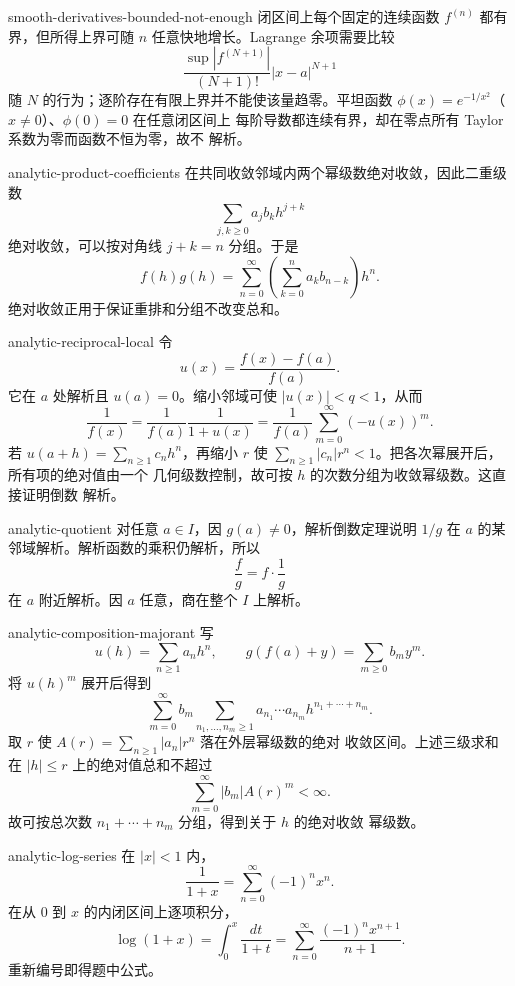 \begin{solution}{smooth-derivatives-bounded-not-enough}
闭区间上每个固定的连续函数 \(f^{(n)}\) 都有界，但所得上界可随 \(n\)
任意快地增长。Lagrange 余项需要比较
\[
 \frac{\sup|f^{(N+1)}|}{(N+1)!}|x-a|^{N+1}
\]
随 \(N\) 的行为；逐阶存在有限上界并不能使该量趋零。平坦函数
\(\phi(x)=e^{-1/x^2}\)（\(x\ne0\)）、\(\phi(0)=0\) 在任意闭区间上
每阶导数都连续有界，却在零点所有 Taylor 系数为零而函数不恒为零，故不
解析。
\end{solution}

\begin{solution}{analytic-product-coefficients}
在共同收敛邻域内两个幂级数绝对收敛，因此二重级数
\[
 \sum_{j,k\ge0}a_jb_kh^{j+k}
\]
绝对收敛，可以按对角线 \(j+k=n\) 分组。于是
\[
 f(h)g(h)=\sum_{n=0}^\infty
 \left(\sum_{k=0}^na_kb_{n-k}\right)h^n.
\]
绝对收敛正用于保证重排和分组不改变总和。
\end{solution}

\begin{solution}{analytic-reciprocal-local}
令
\[
 u(x)=\frac{f(x)-f(a)}{f(a)}.
\]
它在 \(a\) 处解析且 \(u(a)=0\)。缩小邻域可使 \(|u(x)|<q<1\)，从而
\[
 \frac1{f(x)}
 =\frac1{f(a)}\frac1{1+u(x)}
 =\frac1{f(a)}\sum_{m=0}^\infty(-u(x))^m.
\]
若 \(u(a+h)=\sum_{n\ge1}c_nh^n\)，再缩小 \(r\) 使
\(\sum_{n\ge1}|c_n|r^n<1\)。把各次幂展开后，所有项的绝对值由一个
几何级数控制，故可按 \(h\) 的次数分组为收敛幂级数。这直接证明倒数
解析。
\end{solution}

\begin{solution}{analytic-quotient}
对任意 \(a\in I\)，因 \(g(a)\ne0\)，解析倒数定理说明 \(1/g\) 在
\(a\) 的某邻域解析。解析函数的乘积仍解析，所以
\[
 \frac fg=f\cdot\frac1g
\]
在 \(a\) 附近解析。因 \(a\) 任意，商在整个 \(I\) 上解析。
\end{solution}

\begin{solution}{analytic-composition-majorant}
写
\[
 u(h)=\sum_{n\ge1}a_nh^n,\qquad
 g(f(a)+y)=\sum_{m\ge0}b_my^m.
\]
将 \(u(h)^m\) 展开后得到
\[
 \sum_{m=0}^\infty b_m
 \sum_{n_1,\ldots,n_m\ge1}
 a_{n_1}\cdots a_{n_m}h^{n_1+\cdots+n_m}.
\]
取 \(r\) 使 \(A(r)=\sum_{n\ge1}|a_n|r^n\) 落在外层幂级数的绝对
收敛区间。上述三级求和在 \(|h|\le r\) 上的绝对值总和不超过
\[
 \sum_{m=0}^\infty|b_m|A(r)^m<\infty.
\]
故可按总次数 \(n_1+\cdots+n_m\) 分组，得到关于 \(h\) 的绝对收敛
幂级数。
\end{solution}

\begin{solution}{analytic-log-series}
在 \(|x|<1\) 内，
\[
 \frac1{1+x}=\sum_{n=0}^\infty(-1)^nx^n.
\]
在从 \(0\) 到 \(x\) 的内闭区间上逐项积分，
\[
 \log(1+x)
 =\int_0^x\frac{dt}{1+t}
 =\sum_{n=0}^\infty\frac{(-1)^nx^{n+1}}{n+1}.
\]
重新编号即得题中公式。
\end{solution}

